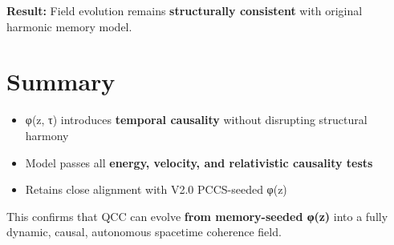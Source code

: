 \documentclass{article}
\begin{document}
\noindent
\textbf{Result:} Field evolution remains \textbf{structurally consistent} with original harmonic memory model.

\section*{Summary}
\begin{itemize}
\item φ(z, τ) introduces \textbf{temporal causality} without disrupting structural harmony
\item Model passes all \textbf{energy, velocity, and relativistic causality tests}
\item Retains close alignment with V2.0 PCCS-seeded φ(z)
\end{itemize}

This confirms that QCC can evolve \textbf{from memory-seeded φ(z)} into a fully dynamic, causal, autonomous spacetime coherence field.
\end{document}
